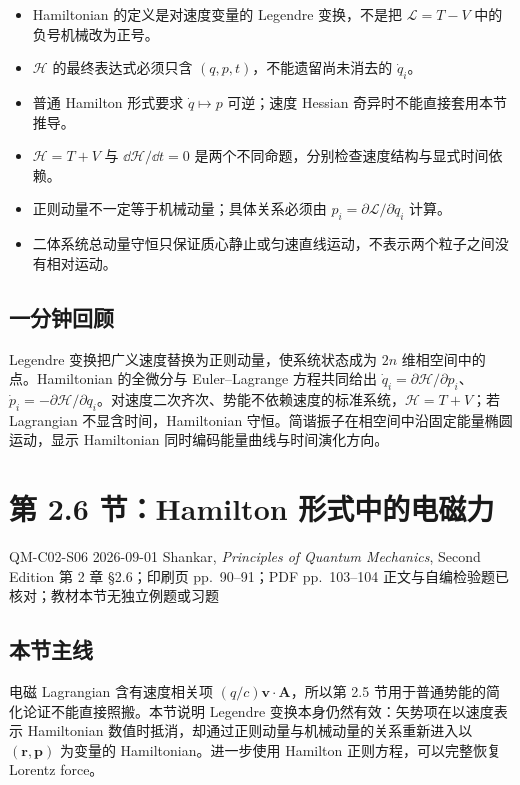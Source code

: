 \begin{itemize}[leftmargin=*]
  \item Hamiltonian 的定义是对速度变量的 Legendre 变换，不是把 $\mathcal L=T-V$ 中的负号机械改为正号。
  \item $\mathcal H$ 的最终表达式必须只含 $(q,p,t)$，不能遗留尚未消去的 $\dot q_i$。
  \item 普通 Hamilton 形式要求 $\dot q\mapsto p$ 可逆；速度 Hessian 奇异时不能直接套用本节推导。
  \item $\mathcal H=T+V$ 与 $\dd\mathcal H/\dd t=0$ 是两个不同命题，分别检查速度结构与显式时间依赖。
  \item 正则动量不一定等于机械动量；具体关系必须由 $p_i=\partial\mathcal L/\partial\dot q_i$ 计算。
  \item 二体系统总动量守恒只保证质心静止或匀速直线运动，不表示两个粒子之间没有相对运动。
\end{itemize}

\subsection{一分钟回顾}

Legendre 变换把广义速度替换为正则动量，使系统状态成为 $2n$ 维相空间中的点。Hamiltonian 的全微分与 Euler--Lagrange 方程共同给出 $\dot q_i=\partial\mathcal H/\partial p_i$、$\dot p_i=-\partial\mathcal H/\partial q_i$。对速度二次齐次、势能不依赖速度的标准系统，$\mathcal H=T+V$；若 Lagrangian 不显含时间，Hamiltonian 守恒。简谐振子在相空间中沿固定能量椭圆运动，显示 Hamiltonian 同时编码能量曲线与时间演化方向。

\section{第 2.6 节：Hamilton 形式中的电磁力}
\label{section:QM-C02-S06}

\studymeta
  {QM-C02-S06}
  {2026-09-01}
  {Shankar, \textit{Principles of Quantum Mechanics}, Second Edition}
  {第 2 章 \S 2.6；印刷页 pp.~90--91；PDF pp.~103--104}
  {正文与自编检验题已核对；教材本节无独立例题或习题}

\subsection{本节主线}

电磁 Lagrangian 含有速度相关项 $(q/c)\bm v\cdot\bm A$，所以第 2.5 节用于普通势能的简化论证不能直接照搬。本节说明 Legendre 变换本身仍然有效：矢势项在以速度表示 Hamiltonian 数值时抵消，却通过正则动量与机械动量的关系重新进入以 $(\bm r,\bm p)$ 为变量的 Hamiltonian。进一步使用 Hamilton 正则方程，可以完整恢复 Lorentz force。

